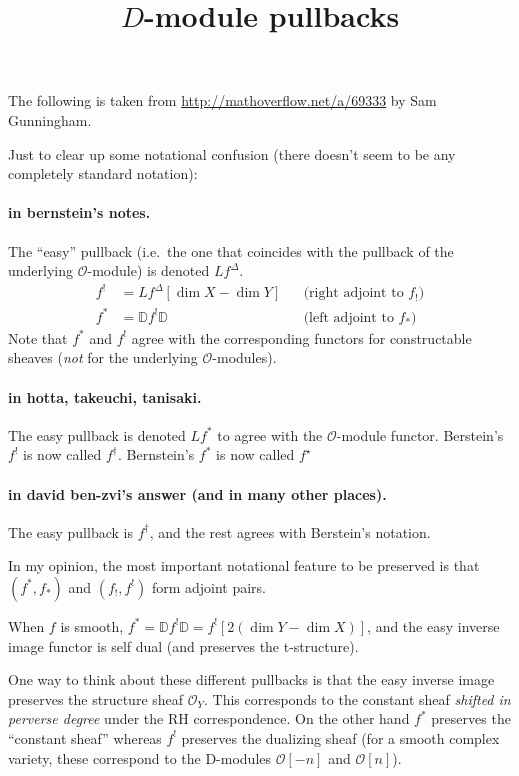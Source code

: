 \documentclass[english, no-theorem-numbers]{short-notes}
\title{\texorpdfstring{$D$}{D}-module pullbacks}
\author{}
\begin{document}
\maketitle

The following is taken from \url{http://mathoverflow.net/a/69333} by Sam Gunningham.

\bigskip
\noindent Just to clear up some notational confusion (there doesn't seem to be any completely standard notation):

\paragraph{in bernstein's notes.}
The \enquote{easy} pullback (i.e.~the one that coincides with the pullback of the underlying $\mathcal O$-module) is denoted $Lf^\Delta$.
\begin{align*}
    f^! & = Lf^\Delta [\dim X - \dim Y] & & \text{(right adjoint to $f_!$)} \\
    f^\ast & = \mathbb D f^! \mathbb D & & \text{(left adjoint to $f_\ast$)}
\end{align*}
Note that $f^\ast$ and $f^!$ agree with the corresponding functors for constructable sheaves (\emph{not} for the underlying $\mathcal O$-modules).

\paragraph{in hotta, takeuchi, tanisaki.}
The easy pullback is denoted $Lf^\ast$ to agree with the $\mathcal O$-module functor.
Berstein's $f^!$ is now called $f^\dagger$.
Bernstein's $f^\ast$ is now called $f^\star$

\paragraph{in david ben-zvi's answer (and in many other places).}
The easy pullback is $f^\dagger$, and the rest agrees with Berstein's notation.

\bigskip
\noindent 
In my opinion, the most important notational feature to be preserved is that $(f^\ast , f_\ast)$ and $(f_! , f^!)$ form adjoint pairs.

When $f$ is smooth, $f^\ast = \mathbb D f^! \mathbb D = f^! [2(\dim Y - \dim X)]$, and the easy inverse image functor is self dual (and preserves the t-structure).

One way to think about these different pullbacks is that the easy inverse image preserves the structure sheaf $\mathcal O_Y$.
This corresponds to the constant sheaf \emph{shifted in perverse degree} under the RH correspondence.
On the other hand $f^\ast$ preserves the \enquote{constant sheaf} whereas $f^!$ preserves the dualizing sheaf (for a smooth complex variety, these correspond to the D-modules $\mathcal O[-n]$ and $\mathcal O[n]$).

\end{document}
